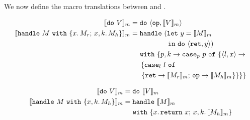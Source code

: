 We now define the macro translations between \lambdah and \lambdahn.

\begin{align*}
\macro{\doop{V}} &= \doopl{\optt}{\macro{V}} \\
\macro{\handle{M}{x}{M_r}{x}{k}{M_h}}
  &= \handlett \ (\letnoin{y}{\macro{M}} \\
  & \hspace{1.88cm} \intt \ \doopl{\rettt}{y}) \\
  & \hspace{4.8mm} \withtt \ \{ p, k \rightarrow \caseptt \ p \ \oftt \ \{ \pair{l}{x} \rightarrow \\
  & \hspace{5.2mm} \{ \casett_l \ l \ \oftt \\
  & \hspace{5.6mm} \{ \rettt \rightarrow \macro{M_r}; \, \optt \rightarrow \macro{M_h} \} \} \} \}
\end{align*}

\begin{align*}
\llbracket \texttt{do} \ V \rrbracket_m &= \texttt{do} \ \llbracket V \rrbracket_m \\
\llbracket \texttt{handle} \ M \ \texttt{with} \ \{ x, k. \, M_h \} \rrbracket_m
  &= \texttt{handle} \ \llbracket M \rrbracket_m \\
  &\hspace{4.8mm} \texttt{with} \ \{ x. \, \texttt{return} \ x; \, x, k. \, \llbracket M_h \rrbracket_m \}
\end{align*}

